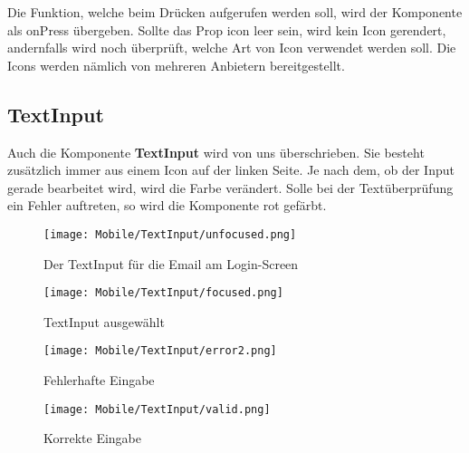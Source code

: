 Die Funktion, welche beim Drücken aufgerufen werden soll, wird der Komponente als onPress übergeben.
Sollte das Prop icon leer sein, wird kein Icon gerendert, andernfalls wird noch überprüft, welche
Art von Icon verwendet werden soll. Die Icons werden nämlich von mehreren Anbietern bereitgestellt.

\newpage
\subsection{TextInput}
Auch die Komponente \textbf{TextInput} wird von uns überschrieben. Sie besteht zusätzlich immer aus einem
Icon auf der linken Seite. Je nach dem, ob der Input gerade bearbeitet wird, wird die Farbe
verändert. Solle bei der Textüberprüfung ein Fehler auftreten, so wird die Komponente rot gefärbt.

\begin{figure}[H]
  \begin{center}
    \texttt{[image: Mobile/TextInput/unfocused.png]}
    \caption{Der TextInput für die Email am Login-Screen}
  \end{center}
\end{figure}

\begin{figure}[H]
  \begin{center}
    \texttt{[image: Mobile/TextInput/focused.png]}
    \caption{TextInput ausgewählt}
  \end{center}
\end{figure}


\begin{figure}[H]
  \begin{center}
    \texttt{[image: Mobile/TextInput/error2.png]}
    \caption{Fehlerhafte Eingabe}
  \end{center}
\end{figure}

\begin{figure}[H]
  \begin{center}
    \texttt{[image: Mobile/TextInput/valid.png]}
    \caption{Korrekte Eingabe}
  \end{center}
\end{figure}